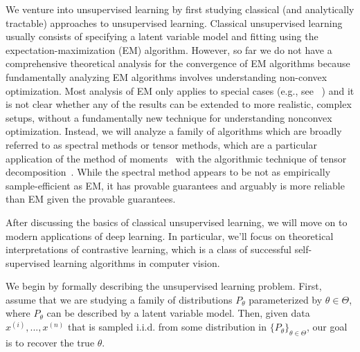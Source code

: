 
We venture into unsupervised learning by first studying classical (and analytically tractable) approaches to unsupervised learning. Classical unsupervised learning usually consists of specifying a latent variable model and fitting using the expectation-maximization (EM) algorithm. However, so far we do not have a comprehensive theoretical analysis for the convergence of EM algorithms because fundamentally analyzing EM algorithms involves understanding non-convex optimization. Most analysis of EM only applies to special cases (e.g., see ~\citet{xu2016global,daskalakis2016ten}) and it is not clear whether any of the results can be extended to more realistic, complex setups, without a fundamentally new technique for understanding nonconvex optimization. 
Instead, we will analyze a family of algorithms which are broadly referred to as spectral methods or tensor methods, which are a particular application of the method of moments~\citep{pearson1894} with the algorithmic technique of tensor decomposition~\citep{anandkumar2015learning}. While the spectral method appears to be not as empirically sample-efficient as EM, it has provable guarantees and arguably is more reliable than EM given the provable guarantees.

After discussing the basics of classical unsupervised learning, we will move on to modern applications of deep learning. In particular, we'll focus on theoretical interpretations of contrastive learning, which is a class of successful self-supervised learning algorithms in computer vision. 


We begin by formally describing the unsupervised learning problem. First, assume that we are studying a family of distributions $P_{\theta}$ parameterized by $\theta \in \Theta$, where $P_{\theta}$ can be described by a latent variable model. Then, given data $x^{(i)},...,x^{(n)}$ that is sampled i.i.d. from some distribution in $\{P_\theta\}_{\theta \in \Theta}$, our goal is to recover the true $\theta$. 


